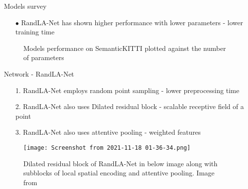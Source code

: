 \documentclass[aspectratio=169]{beamer}
\begin{document}
\begin{frame}{Models survey}
    \begin{itemize}
        \item[$\bullet$] RandLA-Net has shown higher performance with lower parameters - lower training time
    \end{itemize}
    \begin{figure}
        \centering
        
        \caption{Models performance on SemanticKITTI plotted against the number of parameters}       
    \end{figure}
\end{frame}

\begin{frame}{Network - RandLA-Net}
    \begin{itemize}
        \item[1.] RandLA-Net employs random point sampling - lower preprocessing time
        \item[2.] RandLA-Net also uses Dilated residual block - scalable receptive field of a point
        \item[3.] RandLA-Net also uses attentive pooling - weighted features
    \end{itemize}
    \begin{figure}
        \centering
        \texttt{[image: Screenshot from 2021-11-18 01-36-34.png]}
        \caption{Dilated residual block of RandLA-Net in below image along with subblocks of local spatial encoding and attentive pooling. Image from }
        
    \end{figure}
\end{frame}

\end{document}
